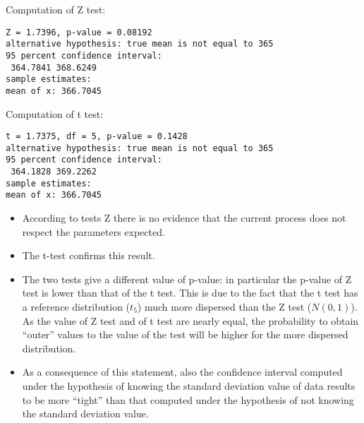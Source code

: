 \begin{frame}[fragile]
  Computation of Z test:
  \begin{verbatim}
Z = 1.7396, p-value = 0.08192
alternative hypothesis: true mean is not equal to 365
95 percent confidence interval:
 364.7841 368.6249
sample estimates:
mean of x: 366.7045
  \end{verbatim}
\end{frame}

\begin{frame}[fragile]
  Computation of t test:
  \begin{verbatim}
t = 1.7375, df = 5, p-value = 0.1428
alternative hypothesis: true mean is not equal to 365
95 percent confidence interval:
 364.1828 369.2262
sample estimates:
mean of x: 366.7045
  \end{verbatim}
\end{frame}

\begin{frame}
  \begin{itemize}
    \item According to tests Z there is no evidence that the current process does not respect the parameters expected.
    \item The t-test confirms this result.
    \item The two tests give a different value of p-value: in particular the p-value of Z  test is lower than that of the t test. This is due to the fact that the t test has a reference distribution ($t_{5}$) much more dispersed than the Z test ($N(0,1)$). As the value of Z test and of t test are nearly equal, the probability to obtain ``outer'' values to the value of the test will be higher for the  more dispersed distribution.
    \item As a consequence of this statement, also the confidence interval computed under the hypothesis of knowing the standard deviation value of data results to be more ``tight'' than that computed under the hypothesis of not knowing the standard deviation value. 
  \end{itemize}
\end{frame}



